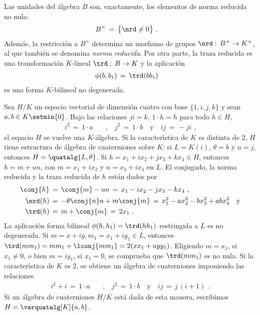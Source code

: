 \begin{lemaNormaYTrazaCuaterniones}\label{lema:normaytrazacuaterniones}
	Las unidades del \'{a}lgebra $B$ son, exactamente, los elementos de
	norma reducida no nula:
	\begin{align*}
		B^{\times} & \,=\,\big\{\nrd\not=0\big\}
		\text{ .}
	\end{align*}
	Adem\'{a}s, la restricci\'{o}n a $B^{\times}$ determina un morfismo de
	grupos $\nrd :\,B^{\times}\rightarrow K^{\times}$, al que tambi\'{e}n
	se denomina \emph{norma reducida}. Por otra parte, la traza reducida es
	una transformaci\'{o}n $K$-lineal $\trd:\,B\rightarrow K$ y la
	aplicaci\'{o}n
	\begin{align*}
		\phi(b,b_{1}) & \,=\,\trd(bb_{1})
	\end{align*}
	es una forma $K$-bilineal no degenerada.
\end{lemaNormaYTrazaCuaterniones}

Sea $H/K$ un espacio vectorial de dimensi\'{o}n cuatro con base
$\{1,i,j,k\}$ y sean $a,b\in K\setmin \{0\}$. Bajo las relaciones
$ji=k$, $1\cdot h=h$ para todo $h\in H$,
\begin{align*}
	i^2 \,=\,1\cdot a & \quad\text{,}\quad
		j^2 \,=\,1\cdot b\quad\text{y}\quad
		ij \,=\,-ji
	\text{ ,}
\end{align*}
%
el espacio $H$ se vuelve una $K$-\'{a}lgebra. Si la caracter\'{\i}stica de $K$
es distinta de $2$, $H$ tiene estructura de \'{a}lgebra de cuaterniones sobre
$K$: si $L=K(i)$, $\theta=b$ y $u=j$, entonces $H=\quatalg{L,\theta}$.
Si $h=x_{1}+ix_{2}+jx_{3}+kx_{4}\in H$, entonces $h=m+un$, con
$m=x_{1}+ix_{2}$ y $n=x_{3}+ix_{4}$ en $L$. El conjugado, la norma reducida y
la traza reducida de $h$ est\'{a}n dados por
\begin{align*}
	\conj{h} & \,=\,\conj{m}-un\,=\,
		x_{1}-ix_{2}-jx_{3}-kx_{4} \text{ ,} \\
	\nrd(h) & \,=\,-\theta\conj{n}n+m\conj{m} \,=\,
		x_{1}^{2}-ax_{2}^{2}-bx_{3}^{2}+abx_{4}^{2} \quad\text{y} \\
	\trd(h) & \,=\, m+\conj{m} \,=\,
		2x_{1}
	\text{ .}
\end{align*}
%
La aplicaci\'{o}n forma bilineal $\phi(h,h_{1})=\trd(hh_{1})$ restringida a $L$
es no degenerada. Si $m=x+iy,m_{1}=x_{1}+iy_{1}\in L$, entonces
$\trd(mm_{1})=mm_{1}+\lconj{mm_{1}}=2(xx_{1}+ayy_{1})$. Eligiendo $m=x_{1}$,
si $x_{1}\not =0$, o bien $m=iy_{1}$, si $x_{1}=0$, se comprueba que
$\trd(mm_{1})$ es no nula.
%
Si la caracter\'{\i}stica de $K$ es $2$, se obtiene un \'{a}lgebra de
cuaterniones imponiendo las relaciones
\begin{align*}
	i^2 + i\,=\, 1\cdot a & \quad\text{,}\quad
	j^2\,=\,1\cdot b \quad\text{y}\quad
	ij\,=\,j\,(i+1)
	\text{ .}
\end{align*}
%
Si un \'{a}lgebra de cuaterniones $H/K$ est\'{a} dada de esta manera,
escribimos $H=\varquatalg[K]{a,b}$.

